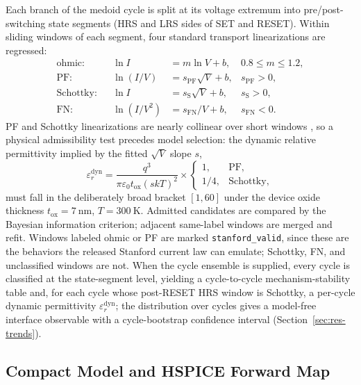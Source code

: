 \documentclass[journal]{IEEEtran}
\begin{document}
Each branch of the medoid cycle is split at its voltage extremum into
pre/post-switching state segments (HRS and LRS sides of SET and RESET).
Within sliding windows of each segment, four standard transport
linearizations are regressed:
\begin{align}
  \text{ohmic:} &&
  \ln I &= m\ln V + b, &
  0.8 \le m \le 1.2, \label{eq:ohmic}\\
  \text{PF:} &&
  \ln(I/V) &= s_{\mathrm{PF}}\sqrt{V}+b, &
  s_{\mathrm{PF}}>0, \label{eq:pf}\\
  \text{Schottky:} &&
  \ln I &= s_{\mathrm{S}}\sqrt{V}+b, &
  s_{\mathrm{S}}>0, \label{eq:schottky}\\
  \text{FN:} &&
  \ln(I/V^2) &= s_{\mathrm{FN}}/V+b, &
  s_{\mathrm{FN}}<0. \label{eq:fn}
\end{align}
PF and Schottky linearizations are nearly collinear over short windows
\cite{chiu2014}, so a physical admissibility test precedes model selection:
the dynamic relative permittivity implied by the fitted $\sqrt{V}$ slope $s$,
\begin{equation}
  \varepsilon_r^{\mathrm{dyn}}
  =
  \frac{q^3}{\pi\varepsilon_0 t_{\mathrm{ox}}(s kT)^2}
  \times
  \begin{cases}
    1, & \mathrm{PF},\\
    1/4, & \mathrm{Schottky},
  \end{cases}
  \label{eq:eps-dyn}
\end{equation}
must fall in the deliberately broad bracket $[1,60]$ under the device oxide
thickness $t_{\mathrm{ox}}=\SI{7}{\nano\meter}$, $T=\SI{300}{\kelvin}$.
Admitted candidates are compared by the Bayesian information criterion;
adjacent same-label windows are merged and refit.  Windows labeled ohmic or
PF are marked \texttt{stanford\_valid}, since these are the behaviors the
released Stanford current law can emulate; Schottky, FN, and unclassified
windows are not.  When the cycle ensemble is supplied, every cycle is
classified at the state-segment level, yielding a cycle-to-cycle
mechanism-stability table and, for each cycle whose post-RESET HRS window is
Schottky, a per-cycle dynamic permittivity $\varepsilon_r^{\mathrm{dyn}}$; the
distribution over cycles gives a model-free interface observable with a
cycle-bootstrap confidence interval (Section~\ref{sec:res-trends}).

\subsection{Compact Model and HSPICE Forward Map}
\label{sec:model}
\end{document}
